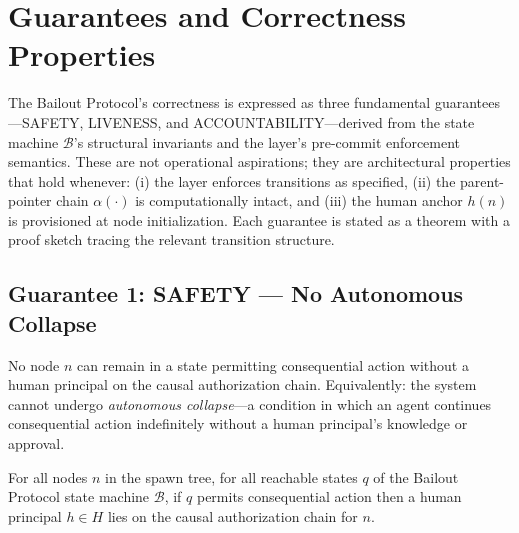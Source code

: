 \section{Guarantees and Correctness Properties}
\label{sec:guarantees}

The Bailout Protocol's correctness is expressed as three fundamental
guarantees---SAFETY, LIVENESS, and ACCOUNTABILITY---derived from the state
machine $\mathcal{B}$'s structural invariants and the \fact{} layer's pre-commit
enforcement semantics.  These are not operational aspirations; they are
architectural properties that hold whenever: (i) the \fact{} layer enforces
transitions as specified, (ii) the parent-pointer chain $\alpha(\cdot)$ is
computationally intact, and (iii) the human anchor $h(n)$ is provisioned at
node initialization.  Each guarantee is stated as a theorem with a proof sketch
tracing the relevant transition structure.

\subsection{Guarantee 1: SAFETY --- No Autonomous Collapse}
\label{sec:guarantee-safety}

\begin{definition}
\label{def:safety}
No node $n$ can remain in a state permitting consequential action without a
human principal on the causal authorization chain.  Equivalently: the system
cannot undergo \emph{autonomous collapse}---a condition in which an agent
continues consequential action indefinitely without a human principal's
knowledge or approval.
\end{definition}

\begin{maintheorem}[SAFETY]
\label{th:safety}
For all nodes $n$ in the spawn tree, for all reachable states $q$ of the Bailout
Protocol state machine $\mathcal{B}$, if $q$ permits consequential action then a
human principal $h \in H$ lies on the causal authorization chain for $n$.
\end{maintheorem}


